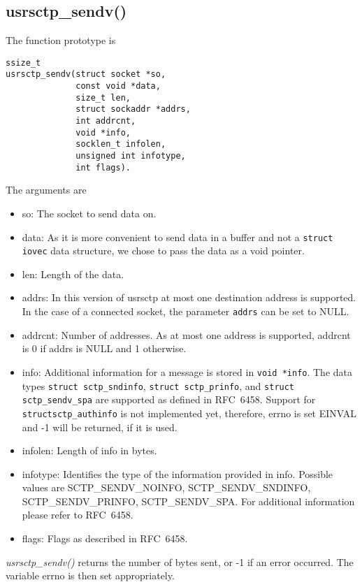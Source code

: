 \documentclass[a4paper]{article}
\begin{document}
\subsection{usrsctp\_sendv()}
The function prototype is
\begin{verbatim}
ssize_t
usrsctp_sendv(struct socket *so,
              const void *data,
              size_t len,
              struct sockaddr *addrs,
              int addrcnt,
              void *info,
              socklen_t infolen,
              unsigned int infotype,
              int flags).
\end{verbatim}
The arguments are
\begin{itemize}
\item so: The socket to send data on.
\item data: As it is more convenient to send data in a buffer and not a \texttt{struct iovec} data structure, we
chose to pass the data as a void pointer.
\item len: Length of the data.
\item addrs: In this version of usrsctp at most one destination address is supported. In the case of a connected
socket, the parameter \texttt{addrs} can be set to NULL.
\item addrcnt: Number of addresses. As at most one address is supported, addrcnt is 0 if addrs is NULL and 
1 otherwise.
\item info: Additional information for a message is stored in \texttt{void *info}. The data types \texttt{struct~sctp\_sndinfo},
\texttt{struct~sctp\_prinfo}, and \texttt{struct} \linebreak \texttt{sctp\_sendv\_spa} are supported as defined in 
RFC~6458. Support for \texttt{structsctp\_authinfo} is not implemented yet, therefore, errno is set EINVAL
and -1 will be returned, if it is used.
\item infolen: Length of info in bytes.
\item infotype: Identifies the type of the information provided in info. Possible values are
SCTP\_SENDV\_NOINFO, SCTP\_SENDV\_SNDINFO, \linebreak SCTP\_SENDV\_PRINFO, SCTP\_SENDV\_SPA. 
For additional information please refer to RFC~6458.
\item flags: Flags as described in RFC~6458.
\end{itemize}

\textit{usrsctp\_sendv()} returns the number of bytes sent, or -1 if an error
occurred.  The variable errno is then set appropriately.
\end{document}
